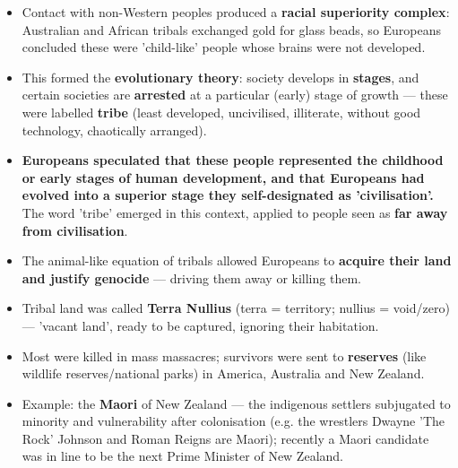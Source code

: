 \begin{KeyConcept}
\begin{itemize}
\item Contact with non-Western peoples produced a \textbf{racial superiority complex}: Australian and African tribals exchanged gold for glass beads, so Europeans concluded these were 'child-like' people whose brains were not developed.
\item This formed the \textbf{evolutionary theory}: society develops in \textbf{stages}, and certain societies are \textbf{arrested} at a particular (early) stage of growth --- these were labelled \textbf{tribe} (least developed, uncivilised, illiterate, without good technology, chaotically arranged).
\item \textbf{Europeans speculated that these people represented the childhood or early stages of human development, and that Europeans had evolved into a superior stage they self-designated as 'civilisation'.} The word 'tribe' emerged in this context, applied to people seen as \textbf{far away from civilisation}.
\end{itemize}
\end{KeyConcept}

\begin{CriticalPoint}
\begin{itemize}
\item The animal-like equation of tribals allowed Europeans to \textbf{acquire their land and justify genocide} --- driving them away or killing them.
\item Tribal land was called \textbf{Terra Nullius} (terra = territory; nullius = void/zero) --- 'vacant land', ready to be captured, ignoring their habitation.
\item Most were killed in mass massacres; survivors were sent to \textbf{reserves} (like wildlife reserves/national parks) in America, Australia and New Zealand.
\item Example: the \textbf{Maori} of New Zealand --- the indigenous settlers subjugated to minority and vulnerability after colonisation (e.g. the wrestlers Dwayne 'The Rock' Johnson and Roman Reigns are Maori); recently a Maori candidate was in line to be the next Prime Minister of New Zealand.
\end{itemize}
\end{CriticalPoint}

